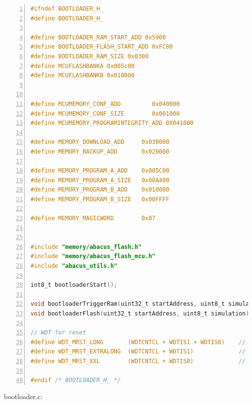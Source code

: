 \documentclass[LaM,binding=0.6cm,oneside]{../sapthesis}
\begin{document}
\begin{lstlisting}[language=C,
                   basicstyle=\scriptsize,
                   numbers=left,
                   stepnumber=0,
                   numbersep=4pt,
                   tabsize=2,
                   showspaces=false,
                   showstringspaces=false]
#ifndef BOOTLOADER_H_
#define BOOTLOADER_H_

#define BOOTLOADER_RAM_START_ADD 0x5900
#define BOOTLOADER_FLASH_START_ADD 0xFC80
#define BOOTLOADER_RAM_SIZE 0x0300
#define MCUFLASHBANKA 0x005c00
#define MCUFLASHBANKB 0x010000


#define MCUMEMORY_CONF_ADD         0x040000
#define MCUMEMORY_CONF_SIZE        0x001000
#define MCUMEMORY_PROGRAMINTEGRITY_ADD 0X041000

#define MEMORY_DOWNLOAD_ADD     0x030000
#define MEMORY_BACKUP_ADD       0x020000

#define MEMORY_PROGRAM_A_ADD    0x005C00
#define MEMORY_PROGRAM_A_SIZE   0x00A400
#define MEMORY_PROGRAM_B_ADD    0x010000
#define MEMORY_PROGRAM_B_SIZE   0x00FFFF

#define MEMORY_MAGICWORD        0x07


#include "memory/abacus_flash.h"
#include "memory/abacus_flash_mcu.h"
#include "abacus_utils.h"

int8_t bootloaderStart();

void bootloaderTriggerRam(uint32_t startAddress, uint8_t simulation);
void bootloaderFlash(uint32_t startAddress, uint8_t simulation);

// WDT for reset
#define WDT_MRST_LONG       (WDTCNTCL + WDTIS1 + WDTIS0)    // 500ms
#define WDT_MRST_EXTRALONG  (WDTCNTCL + WDTIS1)             // 8s
#define WDT_MRST_XXL        (WDTCNTCL + WDTIS0)             // 128s

#endif /* BOOTLOADER_H_ */
\end{lstlisting}

\clearpage
bootloader.c:
\end{document}
